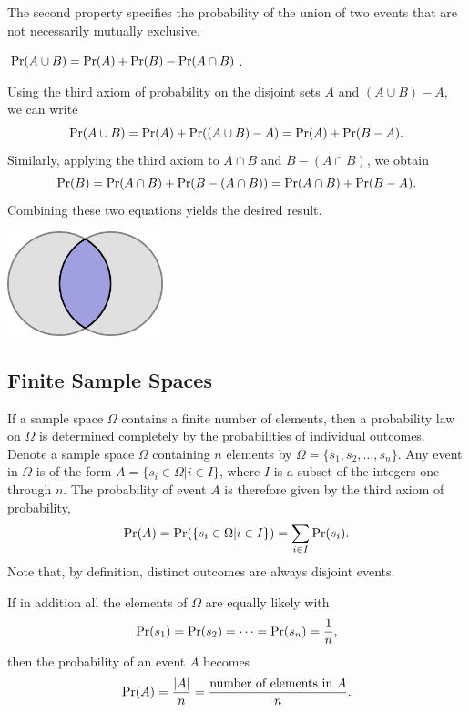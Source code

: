 The second property specifies the probability of the union of two events that are not necessarily mutually exclusive.
\begin{proposition}
$\Pr (A \cup B) = \Pr (A) + \Pr (B) - \Pr (A \cap B)$.
\end{proposition}

Using the third axiom of probability on the disjoint sets $A$ and $(A \cup B) - A$, we can write
\begin{equation*}
\Pr (A \cup B)
= \Pr (A) + \Pr ((A \cup B) - A)
= \Pr (A) + \Pr (B - A) .
\end{equation*}
Similarly, applying the third axiom to $A \cap B$ and $B - (A \cap B)$, we obtain
\begin{equation*}
\Pr (B)
= \Pr (A \cap B) + \Pr (B - (A \cap B))
= \Pr (A \cap B) + \Pr (B - A) .
\end{equation*}
Combining these two equations yields the desired result.

\begin{center}
\includegraphics[height=3.03cm]{Figures/2Chapter/intersection}
\end{center}


\subsection{Finite Sample Spaces}

If a sample space $\Omega$ contains a finite number of elements, then a probability law on $\Omega$ is determined completely by the probabilities of individual outcomes.
Denote a sample space $\Omega$ containing $n$ elements by $\Omega = \{ s_1, s_2, \ldots, s_n \}$.
Any event in $\Omega$ is of the form $A = \{ s_i \in \Omega | i \in I \}$, where $I$ is a subset of the integers one through $n$.
The probability of event $A$ is therefore given by the third axiom of probability,
\begin{equation*}
\Pr (A)
= \Pr ( \{ s_i \in \Omega | i \in I \} )
= \sum_{i \in I} \Pr (s_i) .
\end{equation*}
Note that, by definition, distinct outcomes are always disjoint events.

If in addition all the elements of $\Omega$ are equally likely with
\begin{equation*}
\Pr (s_1) = \Pr (s_2) = \cdots = \Pr (s_n) = \frac{1}{n} ,
\end{equation*}
then the probability of an event $A$ becomes
\begin{equation*}
\Pr (A) = \frac{ |A| }{n}
= \frac{ \text{number of elements in $A$} }{n} .
\end{equation*}

